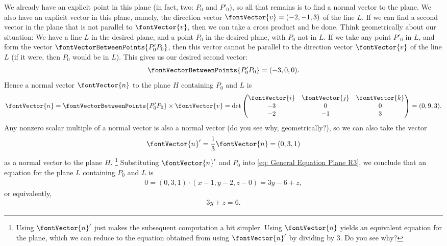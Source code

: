 {We already have an explicit point in this plane (in fact, two: $P_{0}$ and $P'_{0}$), so all that remains is to find a normal vector to the plane. We also have an explicit vector in this plane, namely, the direction vector $\fontVector{v} = (-2,-1,3)$ of the line $L$. If we can find a second vector in the plane that is not parallel to $\fontVector{v}$, then we can take a cross product and be done. Think geometrically about our situation: We have a line $L$ in the desired plane, and a point $P_{0}$ in the desired plane, with $P_{0}$ not in $L$. If we take any point $P'_{0}$ in $L$, and form the vector $\fontVectorBetweenPoints{P'_{0} P_{0}}$, then this vector cannot be parallel to the direction vector $\fontVector{v}$ of the line $L$ (if it were, then $P_{0}$ would be in $L$). This gives us our desired second vector:
\begin{align*}
\fontVectorBetweenPoints{P'_{0} P_{0}}
=
(-3,0,0).
\end{align*}
Hence a normal vector $\fontVector{n}$ to the plane $H$ containing $P_{0}$ and $L$ is
\begin{align*}
\fontVector{n}
=
\fontVectorBetweenPoints{P'_{0} P_{0}} \times \fontVector{v}
=
\det
\begin{pmatrix}
\fontVector{i}	&	\fontVector{j}	&	\fontVector{k}	\\
-3			&	0			&	0			\\
-2			&	-1			&	3
\end{pmatrix}
=
(0,9,3).
\end{align*}
Any nonzero scalar multiple of a normal vector is also a normal vector (do you see why, geometrically?), so we can also take the vector
\begin{align*}
\fontVector{n}'
=
\frac{1}{3} \fontVector{n}
=
(0,3,1)
\end{align*}
as a normal vector to the plane $H$.%
\footnote{Using $\fontVector{n}'$ just makes the subsequent computation a bit simpler. Using $\fontVector{n}$ yields an equivalent equation for the plane, which we can reduce to the equation obtained from using $\fontVector{n}'$ by dividing by $3$. Do you see why?} %
Substituting $\fontVector{n}'$ and $P_{0}$ into \eqref{eq: General Equation Plane R3}, we conclude that an equation for the plane $L$ containing $P_{0}$ and $L$ is
\begin{align*}
0
=
(0,3,1) \cdot (x - 1,y - 2,z - 0)
=
3 y - 6 + z,
\end{align*}
or equivalently,
\begin{align*}
3 y + z
=
6.
\end{align*}
}%





